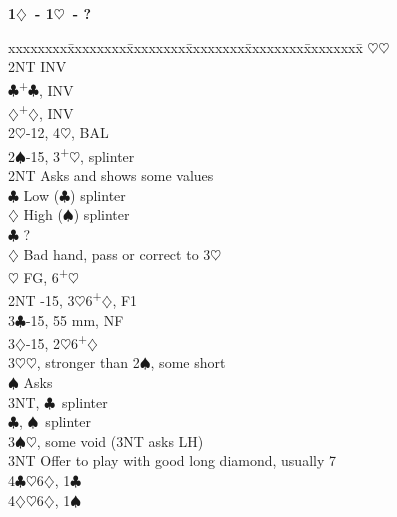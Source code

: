 \documentclass[10pt]{article}
\renewcommand{\c}{$\clubsuit$}
\renewcommand{\d}{$\diamondsuit$}
\newcommand{\h}{$\heartsuit$}
\newcommand{\s}{$\spadesuit$}
\newcommand{\p}{\textsuperscript{+}}
\newcommand{\m}{\textsuperscript{\textminus}}
\newenvironment{bidtable}[1][]
{\textbf{#1}
  \begin{adjustwidth}{1em}{}
    \addvspace{2pt}
    \begin{tabbing}
      xxxxxxxx\=xxxxxxxx\=xxxxxxxx\=xxxxxxxx\=xxxxxxxx\=xxxxxxxx\=\kill}
{\end{tabbing}\end{adjustwidth}\bigskip}%
\begin{document}
\begin{multicols*}{2}
\begin{bidtable}[1\d\ - 1\h\ - ?]
     \>      \h {}\h                              \\
     \> 2NT  \> INV                                     \\
     \c  {}\p\c, INV                              \\
     \d  {}\p\d, INV                              \\
2\h  {}-12, 4\h, BAL                                 \\
2\s  {}-15, 3\p\h, splinter                          \\%
     \> 2NT  \> Asks and shows some values              \\
     \>      \c \> Low (\c) splinter                \\
     \>      \d \> High (\s) splinter               \\
     \c  \> ?                                       \\
     \d  \> Bad hand, pass or correct to 3\h        \\
     \h  \> FG, 6\p\h                               \\
2NT  -15, 3\h 6\p\d, F1                            \\
3\c  {}-15, 55 mm, NF                                \\
3\d  {}-15, 2\m\h 6\p\d                              \\
3\h  {}\h, stronger than 2\s, some short              \\
     \s  \> Asks                                    \\
     \>      \> 3NT, \c\ splinter                       \\
     \>      \c, \s\ splinter                       \\
3\s  {}\h, some void (3NT asks LH)                    \\
3NT  \> Offer to play with good long diamond, usually 7 \\
4\c  {}\h 6\d, 1\c                                    \\
4\d  {}\h 6\d, 1\s                                    \\
\end{bidtable}


\end{multicols*}
\end{document}
